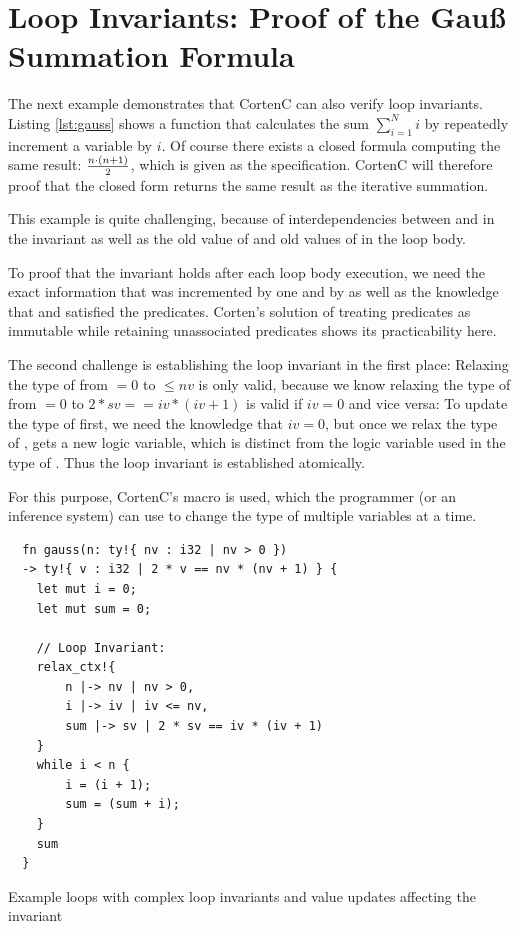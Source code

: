\documentclass[twoside, english]{sdqthesis}
\theoremstyle{definition}
\begin{document}
\section{Loop Invariants: Proof of the Gauß Summation Formula}\label{sec:evaluation-gauss} 

The next example demonstrates that CortenC can also verify loop invariants. Listing \ref{lst:gauss} shows a function that calculates the sum $\sum_{i = 1}^N i$ by repeatedly increment a variable by $i$. 
Of course there exists a closed formula computing the same result: $n \cdot (n + 1) \over 2$, which is given as the specification. CortenC will therefore proof that the closed form returns the same result as the iterative summation.

This example is quite challenging, because of interdependencies between  and  in the invariant as well as the old value of  and old values of  in the loop body. 

To proof that the invariant holds after each loop body execution, we need the exact information that  was incremented by one and  by  as well as the knowledge that  and  satisfied the predicates. 
Corten's solution of treating predicates as immutable while retaining unassociated predicates shows its practicability here. 

The second challenge is establishing the loop invariant in the first place: Relaxing the type of  from $= 0$ to $\leq nv$ is only valid, because we know relaxing the type of  from $= 0$ to $ 2 * sv == iv * (iv + 1)$ is valid if $iv = 0$ and vice versa: To update the type of  first, we need the knowledge that $iv = 0$, but once we relax the type of ,  gets a new logic variable, which is distinct from the logic variable used in the type of . Thus the loop invariant is established atomically.

For this purpose, CortenC's  macro is used, which the programmer (or an inference system) can use to change the type of multiple variables at a time.

\begin{listing}[h]
  \begin{verbatim}
  fn gauss(n: ty!{ nv : i32 | nv > 0 }) 
  -> ty!{ v : i32 | 2 * v == nv * (nv + 1) } {
    let mut i = 0;
    let mut sum = 0;
    
    // Loop Invariant:
    relax_ctx!{
        n |-> nv | nv > 0,
        i |-> iv | iv <= nv,
        sum |-> sv | 2 * sv == iv * (iv + 1)
    }
    while i < n {
        i = (i + 1);
        sum = (sum + i);
    }
    sum
  }
  \end{verbatim}
  \caption{Example loops with complex loop invariants and value updates affecting the invariant}
  \label{lst:gauss}
\end{listing}
\end{document}
